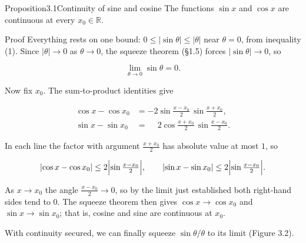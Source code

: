 \documentclass[a4paper,12pt,oneside]{memoir}
\begin{document}
\begin{envproposition}{Proposition}{3.1}{Continuity of sine and cosine}
The functions \(\sin x\) and \(\cos x\) are continuous at every \(x_{0} \in \mathbb{R}\).
\end{envproposition}
\begin{envproof}{Proof}{}{}
Everything rests on one bound: \(0 \le \lvert \sin\theta \rvert \le \lvert \theta \rvert\) near \(\theta = 0\), from inequality (1). Since \(\lvert \theta \rvert \to 0\) as \(\theta \to 0\), the squeeze theorem (§1.5) forces \(\lvert \sin\theta \rvert \to 0\), so

\[ \lim_{\theta \to 0} \sin\theta = 0. \]

Now fix \(x_{0}\). The sum-to-product identities give

\[ \begin{aligned}
        \cos x - \cos x_{0} &= -2 \sin\frac{x - x_{0}}{2}\, \sin\frac{x + x_{0}}{2}, \\
        \sin x - \sin x_{0} &= \phantom{-}2 \cos\frac{x + x_{0}}{2}\, \sin\frac{x - x_{0}}{2}.
      \end{aligned} \]

In each line the factor with argument \(\tfrac{x + x_{0}}{2}\) has absolute value at most \(1\), so

\[ \lvert \cos x - \cos x_{0} \rvert \le 2\Bigl\lvert \sin\tfrac{x - x_{0}}{2} \Bigr\rvert, \qquad \lvert \sin x - \sin x_{0} \rvert \le 2\Bigl\lvert \sin\tfrac{x - x_{0}}{2} \Bigr\rvert. \]

As \(x \to x_{0}\) the angle \(\tfrac{x - x_{0}}{2} \to 0\), so by the limit just established both right-hand sides tend to \(0\). The squeeze theorem then gives \(\cos x \to \cos x_{0}\) and \(\sin x \to \sin x_{0}\); that is, cosine and sine are continuous at \(x_{0}\).
\end{envproof}
With continuity secured, we can finally squeeze \(\sin\theta/\theta\) to its limit (Figure 3.2).
\end{document}
